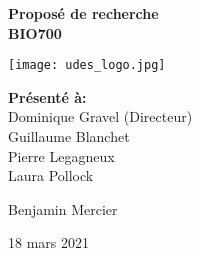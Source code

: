 \begin{titlepage}
    \begin{center}

        \vspace*{-6em}
        
        \Large{\textbf{Proposé de recherche}}\\
        {\textbf{BIO700}}
        \vspace{3em}

        \vspace{3em}
        \texttt{[image: udes\_logo.jpg]}\\
        \vspace{5em}

        \normalsize{\textbf{Présenté à:}\\
        Dominique Gravel (Directeur)\\
        Guillaume Blanchet\\
        Pierre Legagneux\\
        Laura Pollock\\}

        \vspace{15em}
        {Benjamin Mercier}

        18 mars 2021

    \end{center}
\end{titlepage}